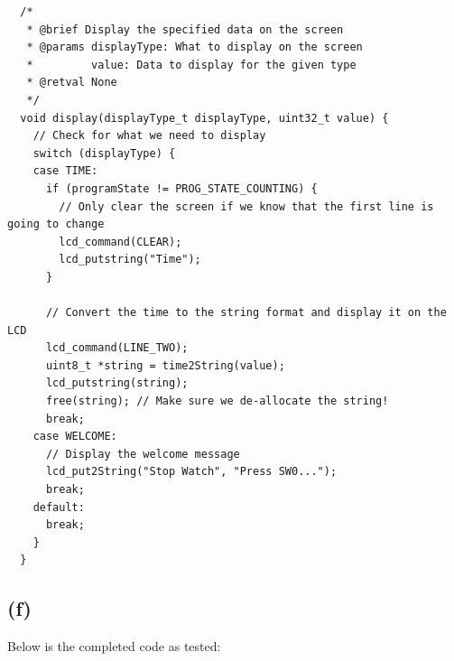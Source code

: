 \begin{verbatim}
  /*
   * @brief Display the specified data on the screen
   * @params displayType: What to display on the screen
   *         value: Data to display for the given type
   * @retval None
   */
  void display(displayType_t displayType, uint32_t value) {
    // Check for what we need to display
    switch (displayType) {
    case TIME:
      if (programState != PROG_STATE_COUNTING) {
        // Only clear the screen if we know that the first line is going to change
        lcd_command(CLEAR);
        lcd_putstring("Time");
      }

      // Convert the time to the string format and display it on the LCD
      lcd_command(LINE_TWO);
      uint8_t *string = time2String(value);
      lcd_putstring(string);
      free(string); // Make sure we de-allocate the string!
      break;
    case WELCOME:
      // Display the welcome message
      lcd_put2String("Stop Watch", "Press SW0...");
      break;
    default:
      break;
    }
  }
\end{verbatim}
\vspace{0.5cm}

\newpage
\subsection*{(f)}
\label{sub:(f)}

Below is the completed code as tested:\\

\inputminted[firstline=1, lastline=50]{c}{main.c}
\newpage
\inputminted[firstline=51, lastline=100]{c}{main.c}
\newpage
\inputminted[firstline=101, lastline=150]{c}{main.c}
\newpage
\inputminted[firstline=151, lastline=200]{c}{main.c}
\newpage
\inputminted[firstline=201, lastline=250]{c}{main.c}
\newpage
\inputminted[firstline=251, lastline=300]{c}{main.c}
\newpage
\inputminted[firstline=301, lastline=337]{c}{main.c}
\newpage






